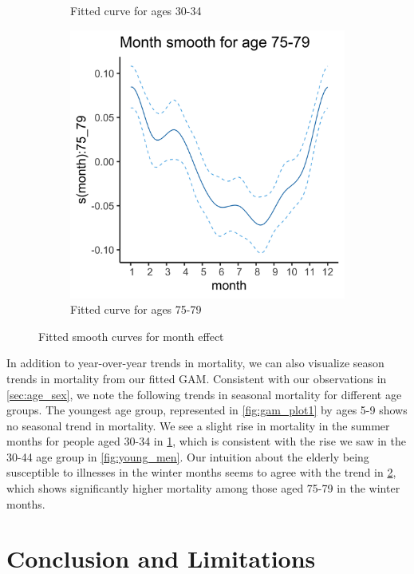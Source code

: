 \documentclass[11pt]{article}
\begin{document}
\begin{figure}
\begin{subfigure}[t]{0.32\textwidth}
\caption{Fitted curve for ages 30-34}
\label{fig:gam_plot2}
\end{subfigure}
\begin{subfigure}[t]{0.32\textwidth}
\centering
\includegraphics[scale=0.077]{figs/gam_plot3.png}
\caption{Fitted curve for ages 75-79}
\label{fig:gam_plot3}
\end{subfigure}
\caption{Fitted smooth curves for month effect}
\label{fig:gam_month}
\end{figure}

In addition to year-over-year trends in mortality, we can also visualize season trends in mortality from our fitted GAM.
Consistent with our observations in \cref{sec:age_sex}, we note the following trends in seasonal mortality for different age groups. 
The youngest age group, represented in \cref{fig:gam_plot1} by ages 5-9 shows no seasonal trend in mortality. 
We see a slight rise in mortality in the summer months for people aged 30-34 in \cref{fig:gam_plot2}, which is consistent with the rise we saw in the 30-44 age group in \cref{fig:young_men}.
Our intuition about the elderly being susceptible to illnesses in the winter months seems to agree with the trend in \cref{fig:gam_plot3}, which shows significantly higher mortality among those aged 75-79 in the winter months. 

\section{Conclusion and Limitations}\label{sec:conclusion}
\end{document}
